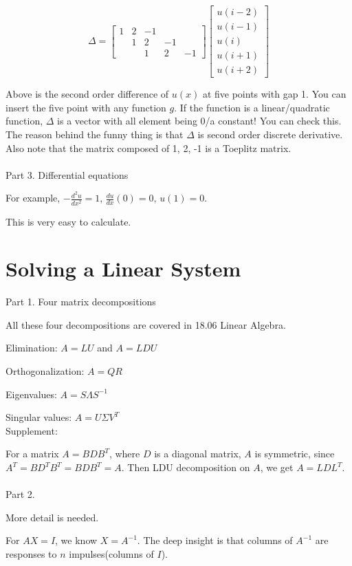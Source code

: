 \documentclass{article}
\begin{document}
\begin{spacing}{1.5}
$$
\Delta = 
\begin{bmatrix}
1 & 2 & -1 \\
  & 1 & 2 & -1 \\
  &   & 1 & 2 & -1
\end{bmatrix}
\begin{bmatrix}
u(i-2) \\
u(i-1) \\
u(i) \\
u(i+1) \\
u(i+2)
\end{bmatrix}
$$

Above is the second order difference of $u(x)$ at five points with gap 1. You can insert the five point with any function $g$. If the function is a linear/quadratic function, $\Delta$ is a vector with all element being 0/a constant! You can check this. The reason behind the funny thing is that $\Delta$ is second order discrete derivative. Also note that the matrix composed of 1, 2, -1 is a Toeplitz matrix.
\\\\ Part 3. Differential equations

For example, $-\frac{d^2u}{dx^2}=1$, $\frac{du}{dx}(0)=0$, $u(1)=0$. 

This is very easy to calculate.


\section{Solving a Linear System}
Part 1. Four matrix decompositions

All these four decompositions are covered in 18.06 Linear Algebra.

Elimination: $A=LU$ and $A=LDU$

Orthogonalization: $A=QR$

Eigenvalues: $A=S\Lambda S^{-1}$

Singular values: $A=U\Sigma V^T$
\\Supplement:

For a matrix $A=BDB^T$, where $D$ is a diagonal matrix, $A$ is symmetric, since $A^T=BD^TB^T=BDB^T=A$. Then LDU decomposition on $A$, we get $A=LDL^T$.
\\\\Part 2.

More detail is needed.

For $AX=I$, we know $X=A^{-1}$. The deep insight is that columns of $A^{-1}$ are responses to $n$ impulses(columns of $I$).



\end{spacing}
\end{document}
